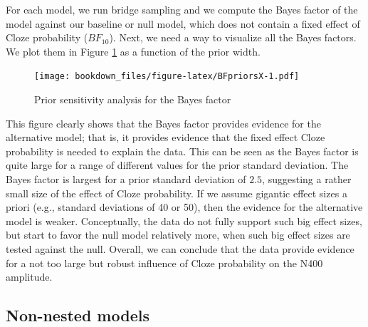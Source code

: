 \documentclass[12pt,]{krantz}
\newenvironment{Shaded}{\begin{snugshade}}{\end{snugshade}}
\newcommand{\CommentTok}[1]{\textcolor[rgb]{0.56,0.35,0.01}{\textit{#1}}}
\newcommand{\DataTypeTok}[1]{\textcolor[rgb]{0.13,0.29,0.53}{#1}}
\newcommand{\KeywordTok}[1]{\textcolor[rgb]{0.13,0.29,0.53}{\textbf{#1}}}
\newcommand{\NormalTok}[1]{#1}
\newcommand{\OperatorTok}[1]{\textcolor[rgb]{0.81,0.36,0.00}{\textbf{#1}}}
\newcommand{\OtherTok}[1]{\textcolor[rgb]{0.56,0.35,0.01}{#1}}
\newcommand{\StringTok}[1]{\textcolor[rgb]{0.31,0.60,0.02}{#1}}
\theoremstyle{definition}
\theoremstyle{definition}
\theoremstyle{definition}
\theoremstyle{remark}
\begin{document}
\begin{Shaded}
\end{Shaded}

For each model, we run bridge sampling and we compute the Bayes factor of the model against our baseline or null model, which does not contain a fixed effect of Cloze probability (\(BF_{10}\)). Next, we need a way to visualize all the Bayes factors. We plot them in Figure \ref{fig:BFpriorsX} as a function of the prior width.

\begin{figure}
\centering
\texttt{[image: bookdown\_files/figure-latex/BFpriorsX-1.pdf]}
\caption{\label{fig:BFpriorsX}Prior sensitivity analysis for the Bayes factor}
\end{figure}

This figure clearly shows that the Bayes factor provides evidence for the alternative model; that is, it provides evidence that the fixed effect Cloze probability is needed to explain the data. This can be seen as the Bayes factor is quite large for a range of different values for the prior standard deviation. The Bayes factor is largest for a prior standard deviation of \(2.5\), suggesting a rather small size of the effect of Cloze probability. If we assume gigantic effect sizes a priori (e.g., standard deviations of 40 or 50), then the evidence for the alternative model is weaker. Conceptually, the data do not fully support such big effect sizes, but start to favor the null model relatively more, when such big effect sizes are tested against the null. Overall, we can conclude that the data provide evidence for a not too large but robust influence of Cloze probability on the N400 amplitude.

\hypertarget{sec:BFnonnested}{%
\subsection{Non-nested models}\label{sec:BFnonnested}}
\end{document}
